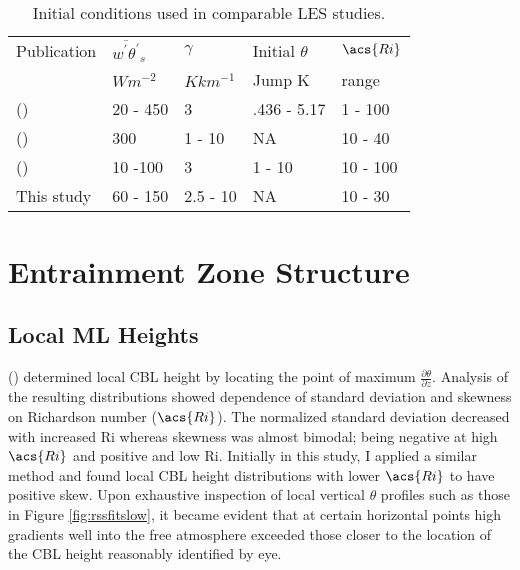 \begin{table}[htbp]
\caption[]{Initial conditions used in comparable \acs{LES} studies.}

    \begin{center}
    \begin{tabular}{ p{4cm} p{1.4cm} p{1.4cm} p{1.7cm} p{1.8cm}}
Publication & $\overline{w^{'}\theta^{'}}_{s}$& $\gamma$& Initial $\theta$ & $\acs{Ri}$ \\ 
& $Wm^{-2}$ & $Kkm^{-1}$ & Jump K & range \\ \hline
      \citeauthor{SullMoengStev} (\citeyear{SullMoengStev}) & 20 - 450& 3  &.436 - 5.17 & 1 - 100\\ %
      \citeauthor{FedConzMir04} (\citeyear{FedConzMir04}) & 300 & 1 - 10 & NA & 10 - 40\\ %
      \citeauthor{BrooksFowler2} (\citeyear{BrooksFowler2}) &  10 -100 &  3& 1 - 10 &10 - 100 \\ %
      This study & 60 - 150 & 2.5 - 10& NA & 10 - 30\\ \hline 
      
    \end{tabular}
\label{table:initconditcomp}   
\end{center}    
\end{table}


\section{Entrainment Zone Structure}
\label{sec:entzonestruc}
\subsection{Local \acs{ML} Heights}

\citeauthor{SullMoengStev} (\citeyear{SullMoengStev}) determined local \acs{CBL} height by locating the point of maximum $\frac{\partial \theta}{\partial z}$.  Analysis of the resulting distributions showed dependence of standard deviation and skewness on Richardson number ($\acs{Ri}$).  The normalized standard deviation decreased with increased \acs{Ri} whereas skewness was almost bimodal; being negative at high $\acs{Ri}$ and positive and low \acs{Ri}.  Initially in this study, I applied a similar method and found local \acs{CBL} height distributions with lower $\acs{Ri}$ to have positive skew.  Upon exhaustive inspection of local vertical $\theta$  profiles such as those in Figure \ref{fig:rssfitslow}, it became evident that at certain horizontal points high gradients well into the free atmosphere exceeded those closer to the location of the \acs{CBL} height reasonably identified by eye.\\

